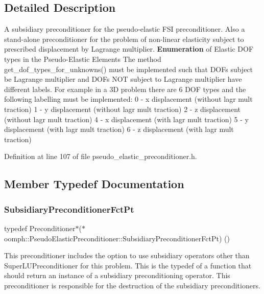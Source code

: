 \subsection{Detailed Description}
A subsidiary preconditioner for the pseudo-\/elastic F\+SI preconditioner. Also a stand-\/alone preconditioner for the problem of non-\/linear elasticity subject to prescribed displacement by Lagrange multiplier. {\bfseries Enumeration} of Elastic D\+OF types in the Pseudo-\/\+Elastic Elements The method get\+\_\+dof\+\_\+types\+\_\+for\+\_\+unknowns() must be implemented such that D\+O\+Fs subject be Lagrange multiplier and D\+O\+Fs N\+OT subject to Lagrange multiplier have different labels. For example in a 3D problem there are 6 D\+OF types and the following labelling must be implemented\+: 0 -\/ x displacement (without lagr mult traction) 1 -\/ y displacement (without lagr mult traction) 2 -\/ z displacement (without lagr mult traction) 4 -\/ x displacement (with lagr mult traction) 5 -\/ y displacement (with lagr mult traction) 6 -\/ z displacement (with lagr mult traction) 

Definition at line 107 of file pseudo\+\_\+elastic\+\_\+preconditioner.\+h.



\subsection{Member Typedef Documentation}
\mbox{\label{classoomph_1_1PseudoElasticPreconditioner_a1462e1ef48ed2668c06dfd36c783d1a5}} 
\subsubsection{\texorpdfstring{Subsidiary\+Preconditioner\+Fct\+Pt}{SubsidiaryPreconditionerFctPt}}
{\footnotesize\ttfamily typedef Preconditioner$\ast$($\ast$ oomph\+::\+Pseudo\+Elastic\+Preconditioner\+::\+Subsidiary\+Preconditioner\+Fct\+Pt) ()}



This preconditioner includes the option to use subsidiary operators other than Super\+L\+U\+Preconditioner for this problem. This is the typedef of a function that should return an instance of a subsidiary preconditioning operator. This preconditioner is responsible for the destruction of the subsidiary preconditioners. 



